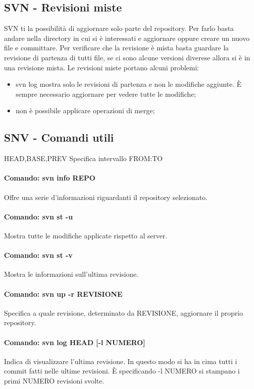 \subsection{SVN - Revisioni miste}
SVN ti la possibilit\`a di aggiornare solo parte del repository. Per farlo basta andare nella directory in cui si \`e interessati e aggiornare oppure creare un nuovo file e committare. \newline
Per verificare che la revisione \`e mista basta guardare la revisione di partenza di tutti file, se ci sono alcune versioni diverese allora si \`e in una revisione mista. \newline
Le revisioni miste portano alcuni problemi:
\begin{itemize}
\item svn log mostra solo le revisioni di partenza e non le modifiche aggiunte. \`E sempre necessario aggiornare per vedere tutte le modifiche;
\item non \`e possibile applicare operazioni di merge;
\end{itemize}

\subsection{SNV - Comandi utili}
HEAD,BASE,PREV \newline
Specifica intervallo FROM:TO \newline

\paragraph{Comando: svn info REPO}
Offre una serie d'informazioni riguardanti il repository selezionato.
\paragraph{Comando: svn st -u}
Mostra tutte le modifiche applicate rispetto al server.
\paragraph{Comando: svn st -v}
Mostra le informazioni sull'ultima revisione.
\paragraph{Comando: svn up -r REVISIONE}
Specifica a quale revisione, determinato da REVISIONE, aggiornare il proprio repository.
\paragraph{Comando: svn log HEAD [-l NUMERO]}
Indica di visualizzare l'ultima revisione. In questo modo si ha in cima tutti i commit fatti nelle ultime revisioni. \`E specificando -l NUMERO si stampano i primi NUMERO revisioni svolte.
